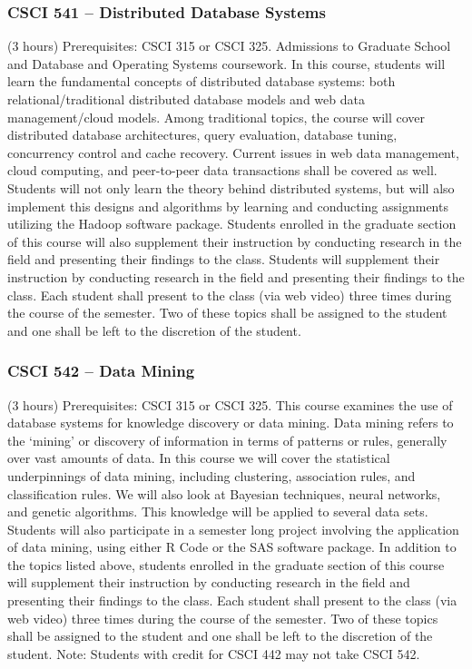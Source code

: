 \subsubsection{CSCI 541 -- Distributed Database Systems}
(3 hours) Prerequisites: CSCI 315 or CSCI 325.  Admissions to Graduate School and Database and Operating Systems coursework.   In this course, students will learn the fundamental concepts of distributed database systems: both relational/traditional distributed database models and web data management/cloud models. Among traditional topics, the course will cover distributed database architectures, query evaluation, database tuning, concurrency control and cache recovery. Current issues in web data management, cloud computing, and peer-to-peer data transactions shall be covered as well. Students will not only learn the theory behind distributed systems, but will also implement this designs and algorithms by learning and conducting assignments utilizing the Hadoop software package. Students enrolled in the graduate section of this course will also supplement their instruction by conducting research in the field and presenting their findings to the class. Students will supplement their instruction by conducting research in the field and presenting their findings to the class. Each student shall present to the class (via web video) three times during the course of the semester. Two of these topics shall be assigned to the student and one shall be left to the discretion of the student. 

\subsubsection{CSCI 542 -- Data Mining}
(3 hours) Prerequisites: CSCI 315 or CSCI 325. This course examines the use of database systems for knowledge discovery or data mining. Data mining refers to the ‘mining’ or discovery of information in terms of patterns or rules, generally over vast amounts of data. In this course we will cover the statistical underpinnings of data mining, including clustering, association rules, and classification rules. We will also look at Bayesian techniques, neural networks, and genetic algorithms. This knowledge will be applied to several data sets. Students will also participate in a semester long project involving the application of data mining, using either R Code or the SAS software package. In addition to the topics listed above, students enrolled in the graduate section of this course will supplement their instruction by conducting research in the field and presenting their findings to the class. Each student shall present to the class (via web video) three times during the course of the semester. Two of these topics shall be assigned to the student and one shall be left to the discretion of the student. Note: Students with credit for CSCI 442 may not take CSCI 542.

